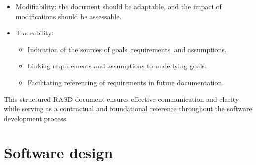 \documentclass[12pt, a4paper]{report}
\begin{document}
\begin{itemize}
            \item Modifiability: the document should be adaptable, and the impact of modifications should be assessable.
            \item Traceability: 
                \begin{itemize}
                    \item Indication of the sources of goals, requirements, and assumptions.
                    \item Linking requirements and assumptions to underlying goals.
                    \item Facilitating referencing of requirements in future documentation.
                \end{itemize}
        \end{itemize}   
        This structured RASD document ensures effective communication and clarity while serving as a contractual and foundational reference throughout the software development process.


\newpage 

\chapter{Software design}
\end{document}
